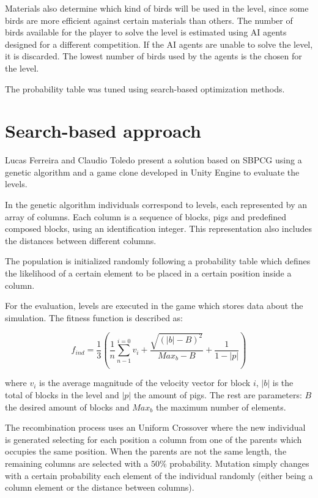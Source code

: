 Materials also determine which kind of birds will be used in the level, since some birds are more efficient against certain materials than others. The number of birds available for the player to solve the level is estimated using AI agents designed for a different competition. If the AI agents are unable to solve the level, it is discarded. The lowest number of birds used by the agents is the chosen for the level.

The probability table was tuned using search-based optimization methods.

\section{Search-based approach}

Lucas Ferreira and Claudio Toledo\cite{ferreira2014search} present a solution based on \acf{SBPCG} using a genetic algorithm and a game clone developed in Unity Engine to evaluate the levels.

In the genetic algorithm individuals correspond to levels, each represented by an array of columns. Each column is a sequence of blocks, pigs and predefined composed blocks, using an identification integer. This representation also includes the distances between different columns. 

The population is initialized randomly following a probability table which defines the likelihood of a certain element to be placed in a certain position inside a column.

For the evaluation, levels are executed in the game which stores data about the simulation. The fitness function is described as:

$$ f_{ind} = \frac{1}{3}(\frac{1}{n} \sum_{n-1}^{i=0}{v_i}+\frac{\sqrt{(|b|-B)^2}}{Max_b-B}+ \frac{1}{1-|p|})$$ 

where $v_i$ is the average magnitude of the velocity vector for block $i$, $|b|$ is the total of blocks in the level  and $|p|$ the amount of pigs. The rest are parameters: $B$ the desired amount of blocks and $Max_b$ the maximum number of elements.

The recombination process uses an Uniform Crossover where the new individual is generated selecting for each position a column from one of the parents which occupies the same position. When the parents are not the same length, the remaining columns are selected with a $50\%$ probability. Mutation simply changes with a certain probability each element of the individual randomly (either being a column element or the distance between columns).


